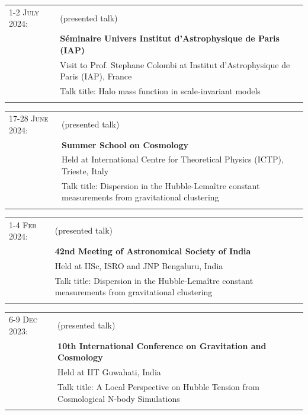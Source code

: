 \documentclass[a4paper,10pt]{article}
\begin{document}
\begin{tabular}{p{2.5cm} p{11cm}}
\textsc{1-2 July 2024:} & {(presented talk)}\\ 
& \textbf{{S\'eminaire Univers Institut d'Astrophysique de Paris (IAP)} }\\
& \footnotesize{Visit to Prof. Stephane Colombi at Institut d'Astrophysique de Paris (IAP), France}\\
& \footnotesize{Talk title: Halo mass function in scale-invariant models}\\ \\

\end{tabular}
\begin{tabular}{p{2.5cm} p{11cm}}

\textsc{17-28 June 2024:} & {(presented talk)}\\ 
& \textbf{{Summer School on Cosmology} }\\
& \footnotesize{Held at International Centre for Theoretical Physics (ICTP), Trieste, Italy}\\
& \footnotesize{Talk title: Dispersion in the Hubble-Lema\^itre constant measurements from gravitational clustering}\\ \\
\end{tabular}
\begin{tabular}{p{2.5cm} p{11cm}}

\textsc{1-4 Feb 2024:} & {(presented talk)}\\ 
& \textbf{{42nd Meeting of Astronomical Society of India} }\\
& \footnotesize{Held at IISc, ISRO and JNP Bengaluru, India}\\
& \footnotesize{Talk title: Dispersion in the Hubble-Lema\^itre constant measurements from gravitational clustering}\\ \\
\end{tabular}
\begin{tabular}{p{2.5cm} p{11cm}}

\textsc{6-9 Dec 2023:} & {(presented talk)}\\ 
& \textbf{{10th International Conference on Gravitation and Cosmology} }\\
& \footnotesize{Held at IIT Guwahati, India}\\
& \footnotesize{Talk title: A Local Perspective on Hubble Tension from Cosmological N-body Simulations}\\ \\
\end{tabular}
\end{document}
